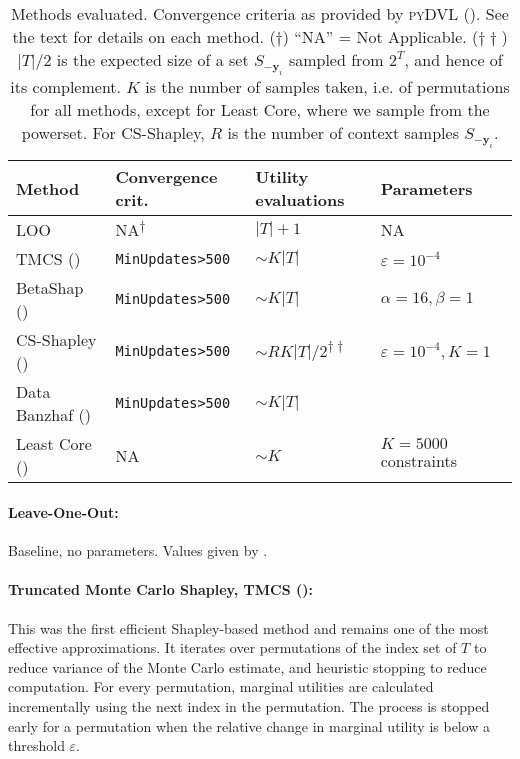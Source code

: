 \documentclass[10pt]{article}
\newcommand{\tmmathbf}[1]{\ensuremath{\boldsymbol{#1}}}
\newcommand{\tmname}[1]{\textsc{#1}}
\newcommand{\tmrsup}[1]{\textsuperscript{#1}}
\newcommand{\python}[1]{\texttt{#1}}
\begin{document}
\begin{table}[h]
  \begin{tabular}{llll}
    {\color[HTML]{000000}}Method & Convergence crit. & Utility evaluations &
    Parameters\\
    \hline
    LOO & NA\tmrsup{$\dagger$} & $| T | + 1$ & NA\\
    TMCS ({\cite{ghorbani_data_2019}}) & {\small{{\python{MinUpdates>500}}}}
    & $\sim K | T |$ & $\varepsilon = 10^{- 4}$\\
    BetaShap ({\cite{kwon_beta_2022}}) & {\small{{\python{MinUpdates>500}}}}
    & $\sim K | T |$ & $\alpha = 16, \beta = 1$\\
    CS-Shapley ({\cite{schoch_csshapley_2022}}) &
    {\small{{\python{MinUpdates>500}}}} & $\sim RK | T | / 2$\tmrsup{$\dagger
    \dagger$} & $\varepsilon = 10^{- 4}, K = 1$\\
    Data Banzhaf ({\cite{wang_data_2022}}) &
    {\small{{\python{MinUpdates>500}}}} & $\sim K | T |$ & \\
    Least Core ({\cite{yan_if_2021}}) & NA & $\sim K$ & $K = 5000$
    constraints
  \end{tabular}
  \caption{Methods evaluated. Convergence criteria as provided by
  {\tmname{pyDVL}} ({\cite{transferlab_pydvl_2022}}). See the text for
  details on each method. ($\dagger$) ``NA'' = Not Applicable. ($\dagger
  \dagger$) $| T | / 2$ is the expected size of a set $S_{-\tmmathbf{y}_i}$
  sampled from $2^T$, and hence of its complement. $K$ is the number of
  samples taken, i.e. of permutations for all methods, except for Least Core,
  where we sample from the powerset. For CS-Shapley, $R$ is the number of
  context samples $S_{-\tmmathbf{y}_i}$.}
\end{table}

\paragraph{Leave-One-Out:}Baseline, no parameters. Values given by
.

\paragraph{Truncated Monte Carlo Shapley, TMCS
({\cite{ghorbani_data_2019}}):}This was the first efficient Shapley-based
method and remains one of the most effective approximations. It iterates over
permutations of the index set of $T$ to reduce variance of the Monte Carlo
estimate, and heuristic stopping to reduce computation. For every permutation,
marginal utilities are calculated incrementally using the next index in the
permutation. The process is stopped early for a permutation when the relative
change in marginal utility is below a threshold $\varepsilon$.
\end{document}
